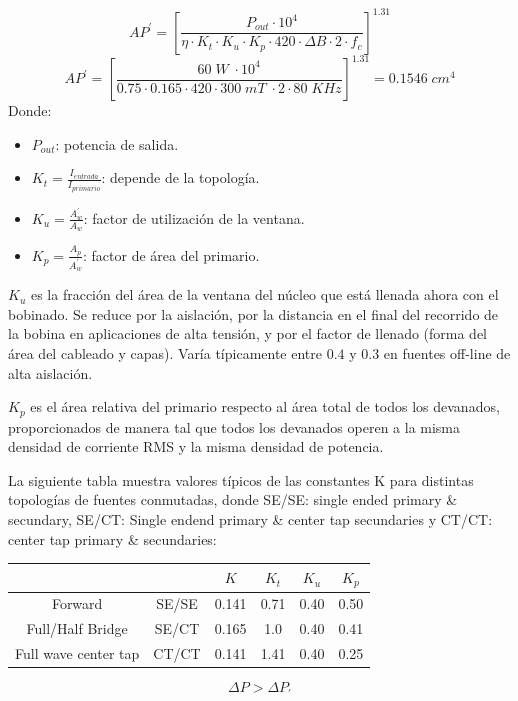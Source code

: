 \documentclass[11pt, a4paper]{article}
\begin{document}
\begin{equation}
AP^{'} = [\frac{P_{out} \cdot 10^4}{\eta \cdot K_t \cdot K_u \cdot K_p \cdot 420 \cdot \Delta B \cdot 2 \cdot f_c}]^{1.31}
\end{equation}
\[ AP^{'} = [\frac{60 \; W \; \cdot 10^4}{0.75 \cdot 0.165 \cdot 420 \cdot 300 \; mT \; \cdot 2 \cdot 80 \; KHz}]^{1.31} = 0.1546 \; cm^4 \]
Donde:
\begin{itemize}
	\item $P_{out}$: potencia de salida.
	\item $K_t = \frac{I_{entrada}}{I_{primario}}$: depende de la topología.
	\item $K_u = \frac{A^{'}_w}{A_w}$: factor de utilización de la ventana.
	\item $K_p = \frac{A_p}{A^{'}_w}$: factor de área del primario. 
\end{itemize}

$K_u$ es la fracción del área de la ventana del núcleo que está llenada ahora con el bobinado. Se reduce por la aislación, por la distancia en el final del recorrido de la bobina en aplicaciones de alta tensión, y por el factor de llenado (forma del área del cableado y capas). Varía típicamente entre $0.4$ y $0.3$ en fuentes off-line de alta aislación.

$K_p$ es el área relativa del primario respecto al área total de todos los devanados, proporcionados de manera tal que todos los devanados operen a la misma densidad de corriente RMS y la misma densidad de potencia.

La siguiente tabla muestra valores típicos de las constantes K para distintas topologías de fuentes conmutadas, donde SE/SE: single ended primary \& secundary, SE/CT: Single endend primary \& center tap secundaries y CT/CT: center tap primary \& secundaries:
\begin{center}
	\begin{tabular}[h]{|c|c|c|c|c|c|}
		\hline
		 & & $K$ & $K_t$ & $K_u$ & $K_p$ \\
		 \hline
		 Forward & SE/SE & 0.141 & 0.71 & 0.40 & 0.50 \\
		 Full/Half Bridge & SE/CT & 0.165 & 1.0 & 0.40 & 0.41 \\ 
		 Full wave center tap & CT/CT & 0.141 & 1.41 & 0.40 & 0.25\\
		 \hline
	\end{tabular}
\end{center}

\begin{equation}
\Delta P > \Delta P_{'}
\label{AP'}
\end{equation}
\end{document}
